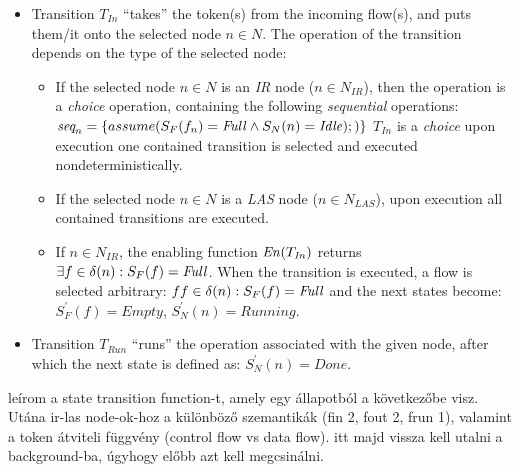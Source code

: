 \begin{definition}
	
\begin{itemize}
	\item Transition \( T_\mathit{In} \) ``takes'' the token(s) from the incoming flow(s), and puts them/it onto the selected node \(n \in N\). The operation of the transition depends on the type of the selected node:
	\begin{itemize}
		\item If the selected node \(n \in N\) is an \emph{IR} node (\(n \in N_\mathit{IR}\)), then the operation is a \emph{choice} operation, containing the following \emph{sequential} operations: \( \emph{seq}_n = \{ assume(S_F(f_n) = \mathit{Full} \wedge S_N(n) = \mathit{Idle});  ) \} \) \( T_\mathit{In} \) is a \emph{choice} upon execution one contained transition is selected and executed nondeterministically.
		\item If the selected node \(n \in N\) is a \emph{LAS} node (\(n \in N_\mathit{LAS}\)), upon execution all contained transitions are executed.
		\item If \(n \in N_\mathit{IR} \), the enabling function \( \mathit{En}(T_\mathit{In}) \) returns \( \exists f \in \delta(n) : S_F(f) = \mathit{Full} \). When the transition is executed, a flow is selected arbitrary: \(f f \in \delta(n) : S_F(f) = \mathit{Full} \) and the next states become: \( S_F^\prime(f) = \mathit{Empty} \), \( S_N^\prime(n) = \mathit{Running} \).
	\end{itemize}
	\item Transition \( T_\mathit{Run} \) ``runs'' the operation associated with the given node, after which the next state is defined as: \(S_N^\prime(n) = \mathit{Done}\). 
\end{itemize}

leírom a state transition function-t, amely egy állapotból a következőbe visz. Utána ir-las node-ok-hoz a különböző szemantikák (fin 2, fout 2, frun 1), valamint a token átviteli függvény (control flow vs data flow). itt majd vissza kell utalni a background-ba, úgyhogy előbb azt kell megcsinálni.


\end{definition}
